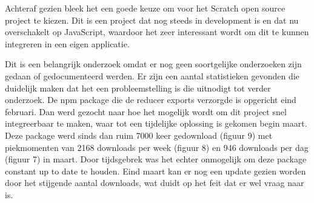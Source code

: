 Achteraf gezien bleek het een goede keuze om voor het Scratch open source project te kiezen. Dit is een project dat nog steeds in development is en dat nu overschakelt op JavaScript, waardoor het zeer interessant wordt om dit te kunnen integreren in een eigen applicatie.   

Dit is een belangrijk onderzoek omdat er nog geen soortgelijke onderzoeken zijn gedaan of gedocumenteerd werden.
Er zijn een aantal statistieken gevonden die duidelijk maken dat het een probleemstelling is die uitnodigt tot verder onderzoek. De npm package die de reducer exports verzorgde is opgericht eind februari. Dan werd gezocht naar hoe het mogelijk wordt om dit project snel integreerbaar te maken, waar tot een tijdelijke oplossing is gekomen begin maart. Deze package werd sinds dan ruim 7000 keer gedownload (figuur 9) met piekmomenten van 2168 downloads per week (figuur 8) en 946 downloads per dag (figuur 7) in maart. Door tijdsgebrek was het echter onmogelijk om deze package constant up to date te houden. Eind maart kan er nog een update gezien worden door het stijgende aantal downloads, wat duidt op het feit dat er wel vraag naar is.